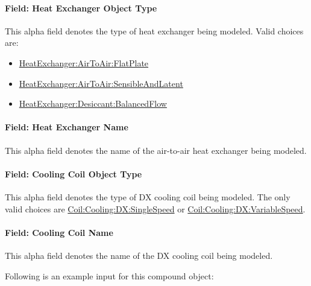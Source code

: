 \paragraph{Field: Heat Exchanger Object Type}\label{field-heat-exchanger-object-type-000}

This alpha field denotes the type of heat exchanger being modeled. Valid choices are:

\begin{itemize}
\item
  \hyperref[heatexchangerairtoairflatplate]{HeatExchanger:AirToAir:FlatPlate}
\item
  \hyperref[heatexchangerairtoairsensibleandlatent]{HeatExchanger:AirToAir:SensibleAndLatent}
\item
  \hyperref[heatexchangerdesiccantbalancedflow]{HeatExchanger:Desiccant:BalancedFlow}
\end{itemize}

\paragraph{Field: Heat Exchanger Name}\label{field-heat-exchanger-name-001}

This alpha field denotes the name of the air-to-air heat exchanger being modeled.

\paragraph{Field: Cooling Coil Object Type}\label{field-cooling-coil-object-type-1}

This alpha field denotes the type of DX cooling coil being modeled. The only valid choices are \hyperref[coilcoolingdxsinglespeed]{Coil:Cooling:DX:SingleSpeed} or \hyperref[coilcoolingdxvariablespeed]{Coil:Cooling:DX:VariableSpeed}.

\paragraph{Field: Cooling Coil Name}\label{field-cooling-coil-name-1}

This alpha field denotes the name of the DX cooling coil being modeled.

Following is an example input for this compound object:

